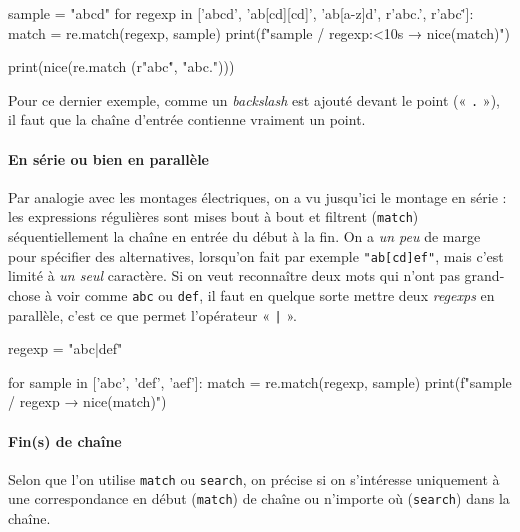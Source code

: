\begin{idleconsole*}
	\begin{pyconsole}
sample = "abcd"
for regexp in ['abcd', 'ab[cd][cd]', 'ab[a-z]d', r'abc.', r'abc\.']:
    match = re.match(regexp, sample)
    print(f"{sample} / {regexp:<10s} → {nice(match)}")%

print(nice(re.match (r"abc\.", "abc.")))
	\end{pyconsole}
\end{idleconsole*}

Pour ce dernier exemple, comme un \textit{backslash} est ajouté devant le point (« \texttt{.} »), il faut que la chaîne d'entrée contienne vraiment un point.

\paragraph{En série ou bien en parallèle}
Par analogie avec les montages électriques, on a vu jusqu'ici le montage en série : les expressions régulières sont mises bout à bout et filtrent (\texttt{match}) séquentiellement la chaîne en entrée du début à la fin. On a \emph{un peu} de marge pour spécifier des alternatives, lorsqu'on fait par exemple \lstinline[basicstyle={\small\shellttfont}]{"ab[cd]ef"}, mais c'est limité à \emph{un seul} caractère. Si on veut reconnaître deux mots qui n'ont pas grand-chose à voir comme \texttt{abc} ou \texttt{def}, il faut en quelque sorte mettre deux \textit{regexps} en parallèle, c'est ce que permet l'opérateur « \texttt{|} ».

\begin{idleconsole}
	\begin{pyconsole}
regexp = "abc|def"

for sample in ['abc', 'def', 'aef']:
    match = re.match(regexp, sample)
    print(f"{sample} / {regexp} → {nice(match)}")

	\end{pyconsole}
\end{idleconsole}

\vspace{1pt}

\paragraph{Fin(s) de chaîne}
Selon que l'on utilise \texttt{match} ou \texttt{search}, on précise si on s'intéresse uniquement à une correspondance en début (\texttt{match}) de chaîne ou n'importe où (\texttt{search}) dans la chaîne.


